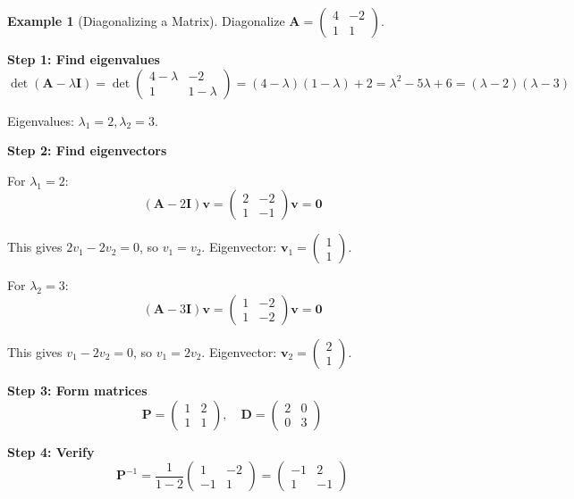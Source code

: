 \documentclass[12pt]{article}
\numberwithin{equation}{section}
\newcommand{\vect}[1]{\boldsymbol{#1}}   %
\newcommand{\mat}[1]{\mathbf{#1}}        %
\theoremstyle{plain}
\theoremstyle{definition}
\newtheorem{example}[theorem]{Example}
\theoremstyle{remark}
\begin{document}
\begin{example}[Diagonalizing a Matrix]
Diagonalize $\mat{A} = \begin{pmatrix} 4 & -2 \\ 1 & 1 \end{pmatrix}$.

\textbf{Step 1: Find eigenvalues}
$$\det(\mat{A} - \lambda\mat{I}) = \det\begin{pmatrix} 4-\lambda & -2 \\ 1 & 1-\lambda \end{pmatrix} = (4-\lambda)(1-\lambda) + 2 = \lambda^2 - 5\lambda + 6 = (\lambda-2)(\lambda-3)$$

Eigenvalues: $\lambda_1 = 2, \lambda_2 = 3$.

\textbf{Step 2: Find eigenvectors}

For $\lambda_1 = 2$:
$$(\mat{A} - 2\mat{I})\vect{v} = \begin{pmatrix} 2 & -2 \\ 1 & -1 \end{pmatrix}\vect{v} = \vect{0}$$

This gives $2v_1 - 2v_2 = 0$, so $v_1 = v_2$. Eigenvector: $\vect{v}_1 = \begin{pmatrix} 1 \\ 1 \end{pmatrix}$.

For $\lambda_2 = 3$:
$$(\mat{A} - 3\mat{I})\vect{v} = \begin{pmatrix} 1 & -2 \\ 1 & -2 \end{pmatrix}\vect{v} = \vect{0}$$

This gives $v_1 - 2v_2 = 0$, so $v_1 = 2v_2$. Eigenvector: $\vect{v}_2 = \begin{pmatrix} 2 \\ 1 \end{pmatrix}$.

\textbf{Step 3: Form matrices}
$$\mat{P} = \begin{pmatrix} 1 & 2 \\ 1 & 1 \end{pmatrix}, \quad \mat{D} = \begin{pmatrix} 2 & 0 \\ 0 & 3 \end{pmatrix}$$

\textbf{Step 4: Verify}
$$\mat{P}^{-1} = \frac{1}{1-2}\begin{pmatrix} 1 & -2 \\ -1 & 1 \end{pmatrix} = \begin{pmatrix} -1 & 2 \\ 1 & -1 \end{pmatrix}$$


\end{example}
\end{document}
